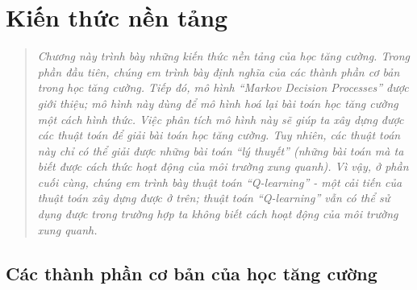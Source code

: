 \chapter{Kiến thức nền tảng}
\ifpdf
\graphicspath{{Chapter2/Chapter2Figs/PNG/}{Chapter2/Chapter2Figs/PDF/}{Chapter2/Chapter2Figs/}}
\else
\graphicspath{{Chapter2/Chapter2Figs/EPS/}{Chapter2/Chapter2Figs/}}
\fi
\begin{quote}
	\textit{Chương này trình bày những kiến thức nền tảng của học tăng cường. 
	Trong phần đầu tiên, chúng em trình bày định nghĩa của các thành phần cơ bản trong học tăng cường. 
	Tiếp đó, mô hình ``Markov Decision Processes'' được giới thiệu; mô hình này dùng để mô hình hoá lại bài toán học tăng cường một cách hình thức.
	Việc phân tích mô hình này sẽ giúp ta xây dựng được các thuật toán để giải bài toán học tăng cường.
	Tuy nhiên, các thuật toán này chỉ có thể giải được những bài toán ``lý thuyết'' (những bài toán mà ta biết được cách thức hoạt động của môi trường xung quanh).
	Vì vậy, ở phần cuối cùng, chúng em trình bày thuật toán ``Q-learning'' - một cải tiến của thuật toán xây dựng được ở trên; thuật toán ``Q-learning'' vẫn có thể sử dụng được trong trường hợp ta không biết cách hoạt động của môi trường xung quanh.}
\end{quote}

\section{Các thành phần cơ bản của học tăng cường}
